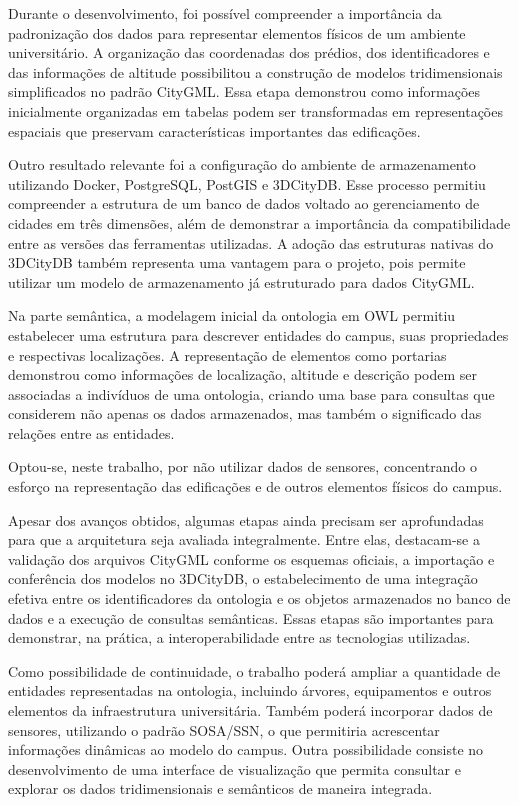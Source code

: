 \documentclass[
  article,   %
  11pt,      %
  oneside,   %
  a4paper,   %
  english,   %
  brazil,    %
  sumario=tradicional
]{abntex2}
\begin{document}
Durante o desenvolvimento, foi possível compreender a importância da padronização dos dados para
representar elementos físicos de um ambiente universitário.
A organização das coordenadas dos prédios, dos identificadores e das informações de altitude
possibilitou a construção de modelos tridimensionais simplificados no padrão CityGML.
Essa etapa demonstrou como informações inicialmente organizadas em tabelas podem ser transformadas
em representações espaciais que preservam características importantes das edificações.

Outro resultado relevante foi a configuração do ambiente de armazenamento utilizando Docker,
PostgreSQL, PostGIS e 3DCityDB.
Esse processo permitiu compreender a estrutura de um banco de dados voltado ao gerenciamento de
cidades em três dimensões, além de demonstrar a importância da compatibilidade entre as versões das
ferramentas utilizadas.
A adoção das estruturas nativas do 3DCityDB também representa uma vantagem para o projeto, pois
permite utilizar um modelo de armazenamento já estruturado para dados CityGML.

Na parte semântica, a modelagem inicial da ontologia em OWL permitiu estabelecer uma estrutura para
descrever entidades do campus, suas propriedades e respectivas localizações.
A representação de elementos como portarias demonstrou como informações de localização, altitude e
descrição podem ser associadas a indivíduos de uma ontologia, criando uma base para consultas que
considerem não apenas os dados armazenados, mas também o significado das relações entre as
entidades.

Optou-se, neste trabalho, por não utilizar dados de sensores, concentrando o esforço na
representação das edificações e de outros elementos físicos do campus.

Apesar dos avanços obtidos, algumas etapas ainda precisam ser aprofundadas para que a arquitetura
seja avaliada integralmente.
Entre elas, destacam-se a validação dos arquivos CityGML conforme os esquemas oficiais, a
importação e conferência dos modelos no 3DCityDB, o estabelecimento de uma integração efetiva entre
os identificadores da ontologia e os objetos armazenados no banco de dados e a execução de
consultas semânticas.
Essas etapas são importantes para demonstrar, na prática, a interoperabilidade entre as tecnologias
utilizadas.

Como possibilidade de continuidade, o trabalho poderá ampliar a quantidade de entidades
representadas na ontologia, incluindo árvores, equipamentos e outros elementos da infraestrutura
universitária.
Também poderá incorporar dados de sensores, utilizando o padrão SOSA/SSN, o que permitiria
acrescentar informações dinâmicas ao modelo do campus.
Outra possibilidade consiste no desenvolvimento de uma interface de visualização que permita
consultar e explorar os dados tridimensionais e semânticos de maneira integrada.
\end{document}

